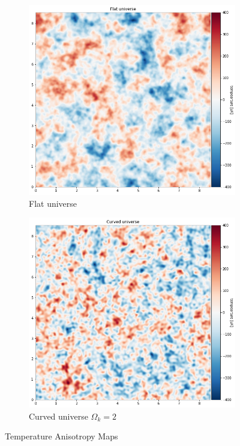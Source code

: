 \documentclass[12pt]{article}
\begin{document}
\begin{figure}[H]
    \centering
    \begin{subfigure}[t]{0.49\textwidth}
        \centering
        \includegraphics[width=\textwidth]{images/flat temperature anisotropy map.png}
        \caption{Flat universe}
        \label{fig:my_label}
    \end{subfigure}
    \hfill
    \begin{subfigure}[t]{0.49\textwidth}
        \centering
        \includegraphics[width=\textwidth]{images/curved temperature anisotropy map.png}
        \caption{Curved universe $\Omega_k = 2$}
        \label{fig:my_label}
    \end{subfigure}
    \caption{Temperature Anisotropy Maps}
    \label{fig:my_label}
\end{figure}
\end{document}
